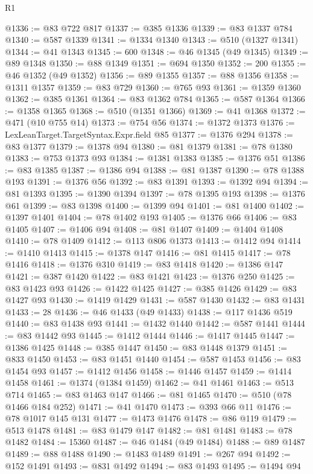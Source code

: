 \begin{lexlean}{R1}
\begin{coremodule}
@1336 := @83 @722 @817
@1337 := @385 @1336
@1339 := @83 @1337 @784
@1340 := @587 @1339
@1341 := @1334 @1340
@1343 := @510 (@1327 @1341)
@1344 := @41 @1343
@1345 := 600
@1348 := @46 @1345 (@49 @1345)
@1349 := @89 @1348
@1350 := @88 @1349
@1351 := @694 @1350
@1352 := 200
@1355 := @46 @1352 (@49 @1352)
@1356 := @89 @1355
@1357 := @88 @1356
@1358 := @1311 @1357
@1359 := @83 @729
@1360 := @765 @93
@1361 := @1359 @1360
@1362 := @385 @1361
@1364 := @83 @1362 @784
@1365 := @587 @1364
@1366 := @1358 @1365
@1368 := @510 (@1351 @1366)
@1369 := @41 @1368
@1372 := @471 (@10 @755 @14)
@1373 := @754 @56
@1374 := @1372 @1373
@1376 := LexLeanTarget.TargetSyntax.Expr.field @85
@1377 := @1376 @294
@1378 := @83 @1377
@1379 := @1378 @94
@1380 := @81 @1379
@1381 := @78 @1380
@1383 := @753 @1373 @93
@1384 := @1381 @1383
@1385 := @1376 @51
@1386 := @83 @1385
@1387 := @1386 @94
@1388 := @81 @1387
@1390 := @78 @1388 @193
@1391 := @1376 @56
@1392 := @83 @1391
@1393 := @1392 @94
@1394 := @81 @1393
@1395 := @1390 @1394
@1397 := @78 @1395 @193
@1398 := @1376 @61
@1399 := @83 @1398
@1400 := @1399 @94
@1401 := @81 @1400
@1402 := @1397 @1401
@1404 := @78 @1402 @193
@1405 := @1376 @66
@1406 := @83 @1405
@1407 := @1406 @94
@1408 := @81 @1407
@1409 := @1404 @1408
@1410 := @78 @1409
@1412 := @113 @806 @1373
@1413 := @1412 @94
@1414 := @1410 @1413
@1415 := @1378 @147
@1416 := @81 @1415
@1417 := @78 @1416
@1418 := @1376 @310
@1419 := @83 @1418
@1420 := @1386 @147
@1421 := @387 @1420
@1422 := @83 @1421
@1423 := @1376 @250
@1425 := @83 @1423 @93
@1426 := @1422 @1425
@1427 := @385 @1426
@1429 := @83 @1427 @93
@1430 := @1419 @1429
@1431 := @587 @1430
@1432 := @83 @1431
@1433 := 28
@1436 := @46 @1433 (@49 @1433)
@1438 := @117 @1436 @519
@1440 := @83 @1438 @93
@1441 := @1432 @1440
@1442 := @587 @1441
@1444 := @83 @1442 @93
@1445 := @1412 @1444
@1446 := @1417 @1445
@1447 := @1386 @1425
@1448 := @385 @1447
@1450 := @83 @1448 @1379
@1451 := @833 @1450
@1453 := @83 @1451 @1440
@1454 := @587 @1453
@1456 := @83 @1454 @93
@1457 := @1412 @1456
@1458 := @1446 @1457
@1459 := @1414 @1458
@1461 := @1374 (@1384 @1459)
@1462 := @41 @1461
@1463 := @513 @714
@1465 := @83 @1463 @147
@1466 := @81 @1465
@1470 := @510 (@78 @1466 @184 @252)
@1471 := @41 @1470
@1473 := @393 @66 @11
@1476 := @78 @1017 @145 @131
@1477 := @1473 @1476
@1478 := @86 @119
@1479 := @513 @1478
@1481 := @83 @1479 @147
@1482 := @81 @1481
@1483 := @78 @1482
@1484 := 15360
@1487 := @46 @1484 (@49 @1484)
@1488 := @89 @1487
@1489 := @88 @1488
@1490 := @1483 @1489
@1491 := @267 @94
@1492 := @152 @1491
@1493 := @831 @1492
@1494 := @83 @1493
@1495 := @1494 @94

\end{coremodule}
\end{lexlean}
